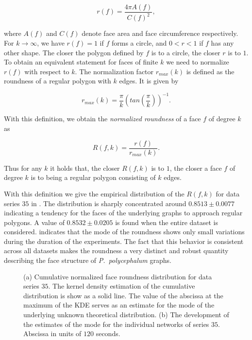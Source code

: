 		\begin{equation}
			 r(f) = \frac{4 \pi A(f)}{C(f)^2},
		\end{equation}

		where $A(f)$ and $C(f)$ denote face area and face circumference respectively. For $k \to \infty$, we have $r(f) = 1$ if $f$ forms a circle, and $0 < r < 1$ if $f$ has any other shape. The closer the polygon defined by $f$ is to a circle, the closer $r$ is to $1$. To obtain an equivalent statement for faces of finite $k$ we need to normalize $r(f)$ with respect to $k$. The normalization factor $r_{max}(k)$ is defined as the roundness of a regular polygon with $k$ edges. It is given by

		\begin{equation}
			r_{max}(k) = \frac{\pi}{k} (tan(\frac{\pi}{k}))^{-1}.
		\end{equation}

		With this definition, we obtain the \emph{normalized roundness} of a face $f$ of degree $k$ as

		\begin{equation}
			R(f,k) = \frac{r(f)}{r_{max}(k)}.
		\end{equation}

		Thus for any $k$ it holds that, the closer $R(f,k)$ is to $1$, the closer a face $f$ of degree $k$ is to being a regular polygon consisting of $k$ edges. 

		With this definition we give the empirical distribution of the $R(f,k)$ for data series $35$ in . The distribution is sharply concentrated around $0.8513 \pm 0.0077$ indicating a tendency for the faces of the underlying graphs to approach regular polygons. A value of $0.8532 \pm 0.0205$ is found when the entire dataset is considered.  indicates that the mode of the roundness shows only small variations during the duration of the experiments. The fact that this behavior is consistent across all datasets makes the roundness a very distinct and robust quantity describing the face structure of \emph{P.~polycephalum} graphs.

		\begin{figure}
			\centering

			\caption[Face roundness distribution.]{(a) Cumulative normalized face roundness distribution for data series $35$. The kernel density estimation of the cumulative distribution is show as a solid line. The value of the abscissa at the maximum of the KDE serves as an estimate for the mode of the underlying unknown theoretical distribution. (b) The development of the estimates of the mode for the individual networks of series $35$. Abscissa in units of $120$ seconds.}
		\end{figure}

